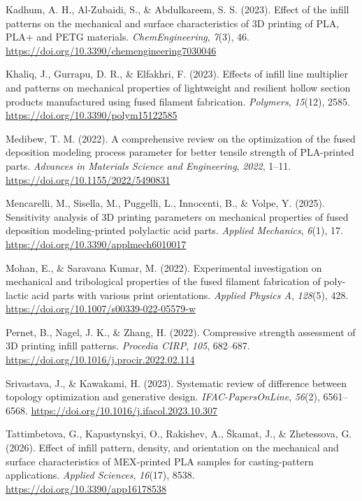 Kadhum, A. H., Al-Zubaidi, S., \& Abdulkareem, S. S. (2023). Effect of the infill patterns on the mechanical and surface characteristics of 3D printing of PLA, PLA+ and PETG materials. \textit{ChemEngineering}, \textit{7}(3), 46. \url{https://doi.org/10.3390/chemengineering7030046}\par
Khaliq, J., Gurrapu, D. R., \& Elfakhri, F. (2023). Effects of infill line multiplier and patterns on mechanical properties of lightweight and resilient hollow section products manufactured using fused filament fabrication. \textit{Polymers}, \textit{15}(12), 2585. \url{https://doi.org/10.3390/polym15122585}\par
Medibew, T. M. (2022). A comprehensive review on the optimization of the fused deposition modeling process parameter for better tensile strength of PLA-printed parts. \textit{Advances in Materials Science and Engineering}, \textit{2022}, 1–11. \url{https://doi.org/10.1155/2022/5490831}\par
Mencarelli, M., Sisella, M., Puggelli, L., Innocenti, B., \& Volpe, Y. (2025). Sensitivity analysis of 3D printing parameters on mechanical properties of fused deposition modeling-printed polylactic acid parts. \textit{Applied Mechanics}, \textit{6}(1), 17. \url{https://doi.org/10.3390/applmech6010017}\par
Mohan, E., \& Saravana Kumar, M. (2022). Experimental investigation on mechanical and tribological properties of the fused filament fabrication of poly-lactic acid parts with various print orientations. \textit{Applied Physics A}, \textit{128}(5), 428. \url{https://doi.org/10.1007/s00339-022-05579-w}\par
Pernet, B., Nagel, J. K., \& Zhang, H. (2022). Compressive strength assessment of 3D printing infill patterns. \textit{Procedia CIRP}, \textit{105}, 682–687. \url{https://doi.org/10.1016/j.procir.2022.02.114}\par
Srivastava, J., \& Kawakami, H. (2023). Systematic review of difference between topology optimization and generative design. \textit{IFAC-PapersOnLine}, \textit{56}(2), 6561–6568. \url{https://doi.org/10.1016/j.ifacol.2023.10.307}\par
Tattimbetova, G., Kapustynskyi, O., Rakishev, A., Škamat, J., \& Zhetessova, G. (2026). Effect of infill pattern, density, and orientation on the mechanical and surface characteristics of MEX-printed PLA samples for casting-pattern applications. \textit{Applied Sciences}, \textit{16}(17), 8538. \url{https://doi.org/10.3390/app16178538}\par
